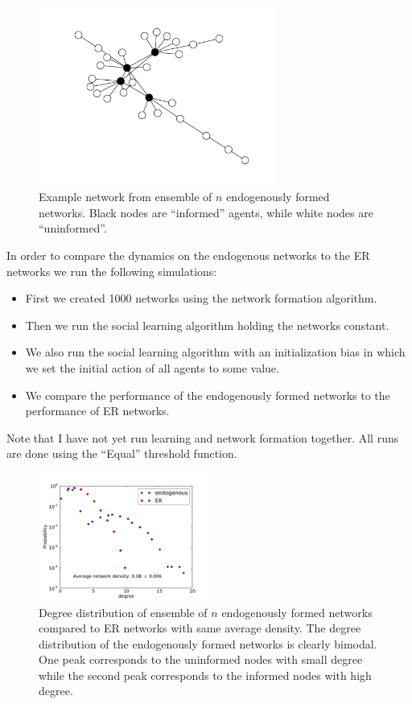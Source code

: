 \documentclass[10pt,a4paper]{article}
\begin{document}
\begin{figure}[ht]
\centering
\includegraphics[width=0.7\textwidth]{figures/EXAMPLE_GRAPH_1}
\caption{Example network from ensemble of $n$ endogenously formed networks. Black nodes are ``informed'' agents, while white nodes are ``uninformed''.}
\label{FIG::EXAMPLE_GRAPH_1}
\end{figure}

\clearpage
In order to compare the dynamics on the endogenous networks to the ER networks we run the following simulations:
\begin{itemize}
\item First we created 1000 networks using the network formation algorithm.
\item Then we run the social learning algorithm holding the networks constant. 
\item We also run the social learning algorithm with an initialization bias in which we set the initial action of all agents to some value.
\item We compare the performance of the endogenously formed networks to the performance of ER networks.
\end{itemize}
Note that I have not yet run learning and network formation together. All runs are done using the ``Equal'' threshold function.

\begin{figure}[ht]
\centering
\includegraphics[width=0.5\textwidth]{figures/ENDO_DEGREE_DIST}
\caption{Degree distribution of ensemble of $n$ endogenously formed networks compared to ER networks with same average density. The degree distribution of the endogenously formed networks is clearly bimodal. One peak corresponds to the uninformed nodes with small degree while the second peak corresponds to the informed nodes with high degree.}
\label{FIG::ENDO_DEGREE_DIST}
\end{figure}
\end{document}
